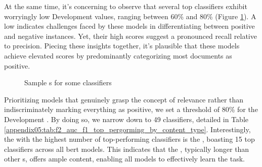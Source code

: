 At the same time, it's concerning to observe that several top classifiers exhibit worryingly low Development \auc{} values, ranging between 60\% and 80\% (Figure \ref{fig:07_vsi_sample_auc}). 
A low \auc{} indicates challenges faced by these models in differentiating between positive and negative instances. 
Yet, their high \fTwo{} scores suggest a pronounced recall relative to precision. 
Piecing these insights together, it's plausible that these models achieve elevated \fTwo{} scores by predominantly categorizing most documents as positive.


\begin{figure}[ht]
    \centering
    \hfill
    \hfill
    \caption{Sample \auc{}s for some classifiers}
    \label{fig:07_vsi_sample_auc}
\end{figure}


Prioritizing models that genuinely grasp the concept of relevance rather than indiscriminately marking everything as positive, we set a threshold of 80\% for the Development \auc{}. By doing so, we narrow down to 49 classifiers, detailed in Table \ref{appendix05:tab:f2_auc_f1_top_pergorming_by_content_type}.
Interestingly, the \contentType{} with the highest number of top-performing classifiers is the \trafilaturaFulltext{}, boasting 15 top classifiers across all \gls{bert} models.
This indicates that the \trafilaturaFulltext{}, typically longer than other \contentType{}s, offers ample content, enabling all models to effectively learn the task.

